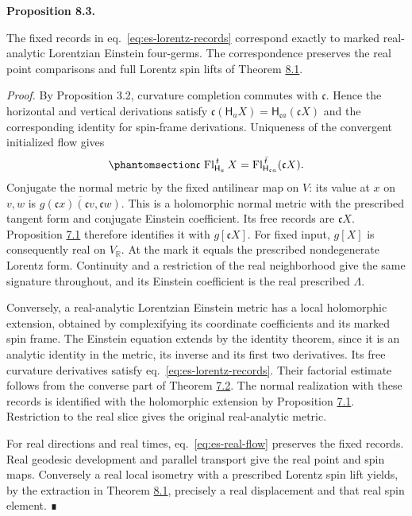 \documentclass[
  english,
  11pt,
  reqno]{amsart}
\makeatletter
\newcommand{\pandocstatementheading}[1]{%
  \par\addpenalty{\@beginparpenalty}%
  \addvspace{.5\baselineskip plus .2\baselineskip minus .2\baselineskip}%
  {\normalfont\bfseries #1\par}%
  \nobreak\@afterindenttrue\@afterheading
}
\makeatother
\begin{document}
\pandocstatementheading{\protect{}\label{prop:es-lorentz-reality}Proposition 8.3.}

The fixed records in eq.~\ref{eq:es-lorentz-records} correspond exactly
to marked real-analytic Lorentzian Einstein four-germs. The
correspondence preserves the real point comparisons and full Lorentz
spin lifts of Theorem \hyperref[thm:es-physical-arrows]{8.1}.

\emph{Proof.} By Proposition 3.2, curvature completion commutes with
\(\mathfrak c\). Hence the horizontal and vertical derivations satisfy
\(\mathfrak c(\mathsf H_aX)=\mathsf H_{\mathfrak ca}(\mathfrak cX)\) and
the corresponding identity for spin-frame derivations. Uniqueness of the
convergent initialized flow gives
\begin{equation}\protect\phantomsection\label{eq:es-real-flow}{
 \mathfrak c\,\operatorname{Fl}_{\mathsf H_a}^{\,t}X
 =\operatorname{Fl}_{\mathsf H_{\mathfrak ca}}^{\,\bar t}
      (\mathfrak cX).
}\end{equation} Conjugate the normal metric by the fixed antilinear map
on \(V\): its value at \(x\) on \(v,w\) is
\(\overline{g(\mathfrak cx)(\mathfrak cv,\mathfrak cw)}\). This is a
holomorphic normal metric with the prescribed tangent form and conjugate
Einstein coefficient. Its free records are \(\mathfrak cX\). Proposition
\hyperref[prop:es-normal-uniqueness]{7.1} therefore identifies it with
\(g[\mathfrak cX]\). For fixed input, \(g[X]\) is consequently real on
\(V_{\mathbb R}\). At the mark it equals the prescribed nondegenerate
Lorentz form. Continuity and a restriction of the real neighborhood give
the same signature throughout, and its Einstein coefficient is the real
prescribed \(\Lambda\).

Conversely, a real-analytic Lorentzian Einstein metric has a local
holomorphic extension, obtained by complexifying its coordinate
coefficients and its marked spin frame. The Einstein equation extends by
the identity theorem, since it is an analytic identity in the metric,
its inverse and its first two derivatives. Its free curvature
derivatives satisfy eq.~\ref{eq:es-lorentz-records}. Their factorial
estimate follows from the converse part of Theorem
\hyperref[thm:es-realization]{7.2}. The normal realization with these
records is identified with the holomorphic extension by Proposition
\hyperref[prop:es-normal-uniqueness]{7.1}. Restriction to the real slice
gives the original real-analytic metric.

For real directions and real times, eq.~\ref{eq:es-real-flow} preserves
the fixed records. Real geodesic development and parallel transport give
the real point and spin maps. Conversely a real local isometry with a
prescribed Lorentz spin lift yields, by the extraction in Theorem
\hyperref[thm:es-physical-arrows]{8.1}, precisely a real displacement
and that real spin element. ∎
\end{document}
